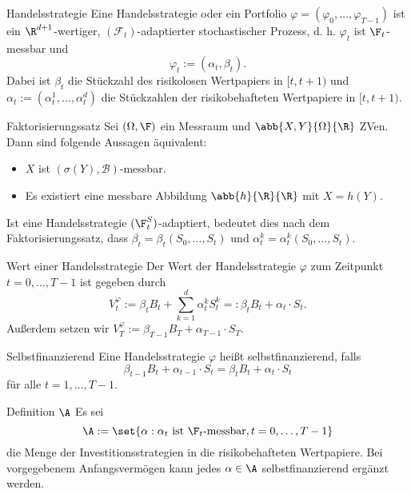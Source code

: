 \begin{karte}{Handelsstrategie}
Eine Handelsstrategie oder ein Portfolio \(\varphi = (\varphi_0, \ldots, \varphi_{T-1})\) ist ein 
\(\R^{d+1}\)-wertiger, \((\mathcal{F}_t)\)-adaptierter stochastischer Prozess, d. h. \(\varphi_t\) 
ist \(\F_t\)-messbar und 
\[ \varphi_t := (\alpha_t, \beta_t). \]
Dabei ist \(\beta_t\) die Stückzahl des risikolosen Wertpapiers in \([t,t+1)\) 
und \(\alpha_t := (\alpha_t^1, \ldots, \alpha_t^d)\) die Stückzahlen der risikobehafteten Wertpapiere 
in \([t,t+1)\). 
\end{karte}

\begin{karte}{Faktorisierungssatz}
Sei \((\Omega, \F)\) ein Messraum und \(\abb{X,Y}{\Omega}{\R}\) ZVen. Dann sind folgende Aussagen äquivalent: 
\begin{itemize}
    \item \(X\) ist \((\sigma(Y), \mathcal{B})\)-messbar. 
    \item Es existiert eine messbare Abbildung \(\abb{h}{\R}{\R}\) mit \(X = h(Y)\).
\end{itemize}

Ist eine Handelsstrategie \((\F_t^S)\)-adaptiert, bedeutet dies nach dem Faktorisierungssatz, 
dass \(\beta_t = \beta_t(S_0, \ldots, S_t)\) und \(\alpha_t^k = \alpha_t^k(S_0, \ldots, S_t)\).
\end{karte}

\begin{karte}{Wert einer Handelsstrategie}
Der Wert der Handelsstrategie \(\varphi\) zum Zeitpunkt \(t = 0, \ldots, T-1\) ist gegeben durch 
\[ V_t^\varphi := \beta_t B_t + \sum_{k=1}^d \alpha_t^k S_t^k =: \beta_t B_t + \alpha_t \cdot S_t. \]
Außerdem setzen wir \(V_T^\varphi := \beta_{T-1}B_T + \alpha_{T-1} \cdot S_T\).
\end{karte}

\begin{karte}{Selbstfinanzierend}
Eine Handelsstrategie \(\varphi\) heißt selbstfinanzierend, falls 
\[ \beta_{t-1} B_t + \alpha_{t-1} \cdot S_t = \beta_t B_t + \alpha_t \cdot S_t \]
für alle \(t=1,\ldots, T-1\).
\end{karte}

\begin{karte}{Definition \(\A\)}
Es sei 
\[ \A := \set{ \alpha : \alpha_t \text{ ist } \F_t \text{-messbar}, t=0,\ldots, T-1 } \]
die Menge der Investitionsstrategien in die risikobehafteten Wertpapiere. Bei vorgegebenem Anfangsvermögen 
kann jedes \(\alpha \in \A\) selbstfinanzierend ergänzt werden.
\end{karte}

